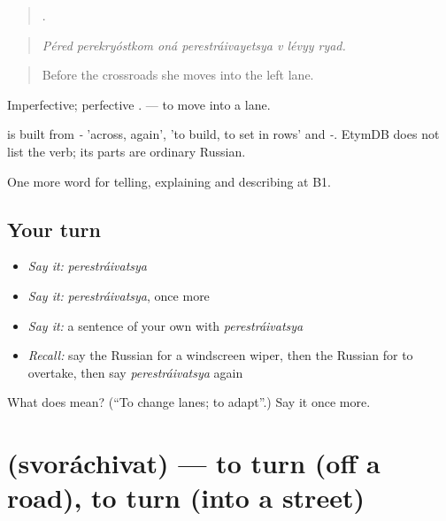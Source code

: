 \begin{quote}
      .
\end{quote}

\begin{quote}
\emph{Péred perekryóstkom oná perestráivayetsya v lévyy ryad.}
\end{quote}

\begin{quote}
Before the crossroads she moves into the left lane.
\end{quote}

Imperfective; perfective \emph{}. \emph{  } — to move into a lane.

\begin{cousinweb}
\emph{} is built from \emph{-} 'across, again', \emph{} 'to build, to set in rows' and \emph{-}. EtymDB does not list the verb; its parts are ordinary Russian.
\end{cousinweb}

\begin{grammarlens}[title={What you've built}]
One more word for telling, explaining and describing at B1.
\end{grammarlens}

\subsection*{Your turn}
\begin{itemize}
\raggedright
  \item \emph{Say it:} \emph{perestráivatsya}
  \item \emph{Say it:} \emph{perestráivatsya}, once more
  \item \emph{Say it:} a sentence of your own with \emph{perestráivatsya}
  \item \emph{Recall:} say the Russian for a windscreen wiper, then the Russian for to overtake, then say \emph{perestráivatsya} again
\end{itemize}

\begin{tcolorbox}[breakable,colback=teal!4,colframe=teal!35!black,title={Before you move on}]
What does  mean? (\textquotedblleft{}To change lanes; to adapt\textquotedblright{}.) Say it once more.
\end{tcolorbox}
\section[\texorpdfstring{\ru{сворачивать} (svoráchivat)}{сворачивать (svoráchivat)}]{ (svoráchivat) — to turn (off a road), to turn (into a street)}


